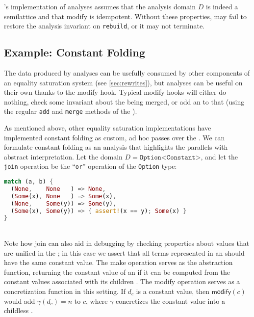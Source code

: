 \Egg's implementation of \eclass analyses assumes that the analysis domain $D$
  is indeed a semilattice and that \textsf{modify} is idempotent.
Without these properties, \egg may fail to restore the analysis invariant on
  \texttt{rebuild}, or it may not terminate.

\subsection{Example: Constant Folding}

The data produced by \eclass analyses can be
  usefully consumed by other components of an equality saturation system
  (see \autoref{sec:rewrites}),
  but \eclass analyses can be useful on their own thanks to the
  \textsf{modify} hook.
Typical \textsf{modify} hooks will either do nothing, check some invariant about
  the \eclasses being merged, or add an \enode to that \eclass
  (using the regular \texttt{add} and \texttt{merge} methods of the \egraph).

As mentioned above, other equality saturation implementations have implemented
  constant folding as custom, ad hoc passes over the \egraph.
We can formulate constant folding as an \eclass analysis that highlights the
  parallels with abstract interpretation.
Let the domain $D = \texttt{Option<Constant>}$, and let the \texttt{join}
  operation be the ``\texttt{or}'' operation of the \texttt{Option} type:
\\
\begin{minipage}{\linewidth}
\begin{lstlisting}[language=Rust, basicstyle=\ttfamily\footnotesize, xleftmargin=35mm]
match (a, b) {
  (None,    None   ) => None,
  (Some(x), None   ) => Some(x),
  (None,    Some(y)) => Some(y),
  (Some(x), Some(y)) => { assert!(x == y); Some(x) }
}
\end{lstlisting}
\end{minipage}
\\
Note how \textsf{join} can also aid in debugging by checking properties about
  values that are unified in the \egraph;
  in this case we assert that all terms represented in an \eclass should have
  the same constant value.
The \textsf{make} operation serves as the abstraction function, returning the
  constant value of an \enode if it can be computed from the constant values
  associated with its children \eclasses.
The \textsf{modify} operation serves as a concretization function in this
  setting.
If $d_{c}$ is a constant value, then $\textsf{modify}(c)$ would add
  $\gamma(d_{c}) = n$ to $c$, where $\gamma$ concretizes the constant value into
  a childless \enode.

